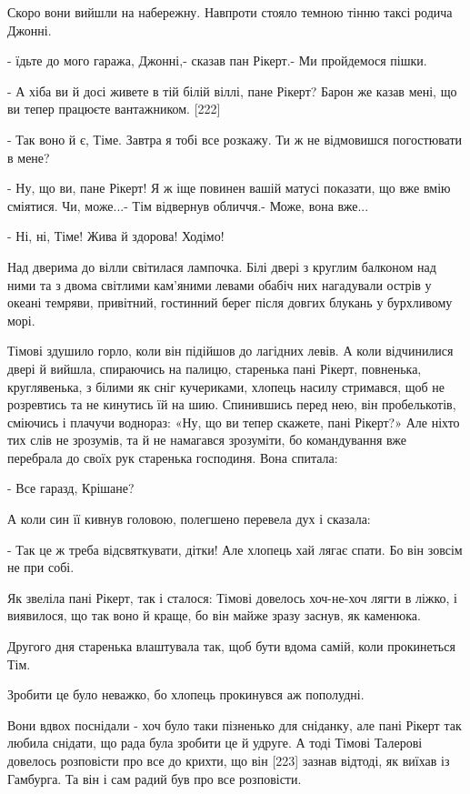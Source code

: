 Скоро вони вийшли на набережну. Навпроти стояло темною тінню таксі родича Джонні.

- їдьте до мого гаража, Джонні,- сказав пан Рікерт.- Ми пройдемося пішки.

- А хіба ви й досі живете в тій білій віллі, пане Рікерт? Барон же казав мені, що ви тепер працюєте вантажником. [222]

- Так воно й є, Тіме. Завтра я тобі все розкажу. Ти ж не відмовишся погостювати в мене?

- Ну, що ви, пане Рікерт! Я ж іще повинен вашій матусі показати, що вже вмію сміятися. Чи, може...- Тім відвернув обличчя.- Може, вона вже...

- Ні, ні, Тіме! Жива й здорова! Ходімо!

Над дверима до вілли світилася лампочка. Білі двері з круглим балконом над ними та з двома світлими кам'яними левами обабіч них нагадували острів у океані темряви, привітний, гостинний берег після довгих блукань у бурхливому морі.

Тімові здушило горло, коли він підійшов до лагідних левів. А коли відчинилися двері й вийшла, спираючись на палицю, старенька пані Рікерт, повненька, круглявенька, з білими як сніг кучериками, хлопець насилу стримався, щоб не розревтись та не кинутись їй на шию. Спинившись перед нею, він пробелькотів, сміючись і плачучи воднораз: «Ну, що ви тепер скажете, пані Рікерт?» Але ніхто тих слів не зрозумів, та й не намагався зрозуміти, бо командування вже перебрала до своїх рук старенька господиня. Вона спитала:

- Все гаразд, Крішане?

А коли син її кивнув головою, полегшено перевела дух і сказала:

- Так це ж треба відсвяткувати, дітки! Але хлопець хай лягає спати. Бо він зовсім не при собі.

Як звеліла пані Рікерт, так і сталося: Тімові довелось хоч-не-хоч лягти в ліжко, і виявилося, що так воно й краще, бо він майже зразу заснув, як каменюка.

Другого дня старенька влаштувала так, щоб бути вдома самій, коли прокинеться Тім.

Зробити це було неважко, бо хлопець прокинувся аж пополудні.

Вони вдвох поснідали - хоч було таки пізненько для сніданку, але пані Рікерт так любила снідати, що рада була зробити це й удруге. А тоді Тімові Талерові довелось розповісти про все до крихти, що він [223] зазнав відтоді, як виїхав із Гамбурга. Та він і сам радий був про все розповісти.

